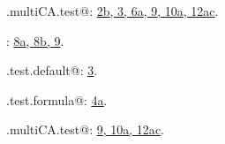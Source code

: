 \documentclass[reqno]{amsart}
\renewcommand{\NWlink}[2]{\hyperlink{#1}{#2}}
\begin{document}
{\small\begin{list}{}{\setlength{\itemsep}{-\parsep}\setlength{\itemindent}{-\leftmargin}}
\item \verb@.multiCA.test@: \underline{\NWlink{nuweb2b}{2b}}\NWlink{nuweb3}{, 3}\NWlink{nuweb6a}{, 6a}\NWlink{nuweb9}{, 9}\NWlink{nuweb10a}{, 10a}\NWlink{nuweb12a}{, 12a}\NWlink{nuweb12c}{c}.
\item \verb@cnonct@: \underline{\NWlink{nuweb8a}{8a}}\NWlink{nuweb8b}{, 8b}\NWlink{nuweb9}{, 9}.
\item \verb@multiCA.test.default@: \underline{\NWlink{nuweb3}{3}}.
\item \verb@multiCA.test.formula@: \underline{\NWlink{nuweb4a}{4a}}.
\item \verb@power.multiCA.test@: \underline{\NWlink{nuweb9}{9}}\NWlink{nuweb10a}{, 10a}\NWlink{nuweb12a}{, 12a}\NWlink{nuweb12c}{c}.
\end{list}}
\end{document}
